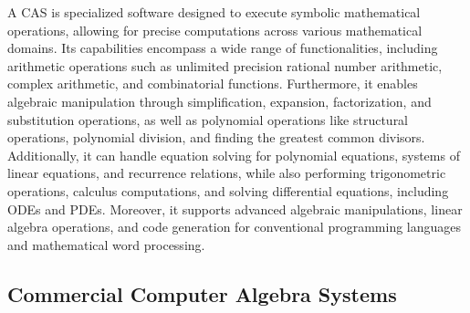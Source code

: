 A \ac{CAS} is specialized software designed to execute symbolic mathematical operations, allowing for precise computations across various mathematical domains. Its capabilities encompass a wide range of functionalities, including arithmetic operations such as unlimited precision rational number arithmetic, complex arithmetic, and combinatorial functions. Furthermore, it enables algebraic manipulation through simplification, expansion, factorization, and substitution operations, as well as polynomial operations like structural operations, polynomial division, and finding the greatest common divisors. Additionally, it can handle equation solving for polynomial equations, systems of linear equations, and recurrence relations, while also performing trigonometric operations, calculus computations, and solving differential equations, including \acp{ODE} and \acp{PDE}. Moreover, it supports advanced algebraic manipulations, linear algebra operations, and code generation for conventional programming languages and mathematical word processing.

\subsection{Commercial Computer Algebra Systems}

